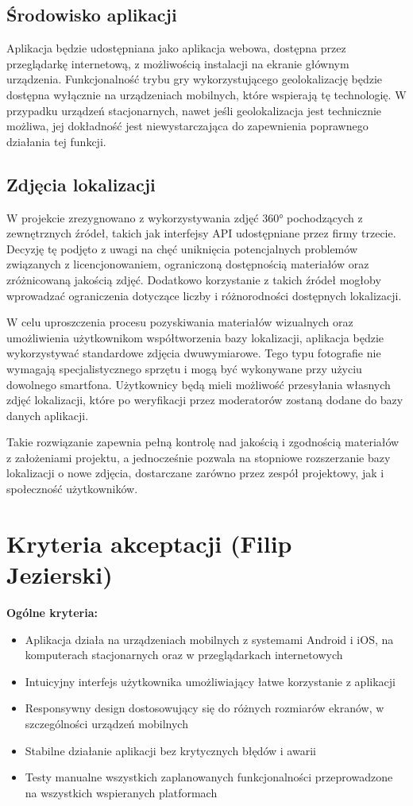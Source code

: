 \subsection{Środowisko aplikacji}
Aplikacja będzie udostępniana jako aplikacja webowa, dostępna przez przeglądarkę internetową, z możliwością instalacji na ekranie głównym urządzenia. Funkcjonalność trybu gry wykorzystującego geolokalizację będzie dostępna wyłącznie na urządzeniach mobilnych, które wspierają tę technologię. W przypadku urządzeń stacjonarnych, nawet jeśli geolokalizacja jest technicznie możliwa, jej dokładność jest niewystarczająca do zapewnienia poprawnego działania tej funkcji.

\subsection{Zdjęcia lokalizacji}
W projekcie zrezygnowano z wykorzystywania zdjęć 360° pochodzących z zewnętrznych źródeł, takich jak interfejsy API udostępniane przez firmy trzecie. Decyzję tę podjęto z uwagi na chęć uniknięcia potencjalnych problemów związanych z licencjonowaniem, ograniczoną dostępnością materiałów oraz zróżnicowaną jakością zdjęć. Dodatkowo korzystanie z takich źródeł mogłoby wprowadzać ograniczenia dotyczące liczby i różnorodności dostępnych lokalizacji.

W celu uproszczenia procesu pozyskiwania materiałów wizualnych oraz umożliwienia użytkownikom współtworzenia bazy lokalizacji, aplikacja będzie wykorzystywać standardowe zdjęcia dwuwymiarowe. Tego typu fotografie nie wymagają specjalistycznego sprzętu i mogą być wykonywane przy użyciu dowolnego smartfona. Użytkownicy będą mieli możliwość przesyłania własnych zdjęć lokalizacji, które po weryfikacji przez moderatorów zostaną dodane do bazy danych aplikacji.

Takie rozwiązanie zapewnia pełną kontrolę nad jakością i zgodnością materiałów z założeniami projektu, a jednocześnie pozwala na stopniowe rozszerzanie bazy lokalizacji o nowe zdjęcia, dostarczane zarówno przez zespół projektowy, jak i społeczność użytkowników.

\section{Kryteria akceptacji (Filip Jezierski)}
\textbf{Ogólne kryteria:}
\begin{itemize}
    \item Aplikacja działa na urządzeniach mobilnych z systemami Android i iOS, na komputerach stacjonarnych oraz w przeglądarkach internetowych
    \item Intuicyjny interfejs użytkownika umożliwiający łatwe korzystanie z aplikacji
    \item Responsywny design dostosowujący się do różnych rozmiarów ekranów, w szczególności urządzeń mobilnych
    \item Stabilne działanie aplikacji bez krytycznych błędów i awarii
    \item Testy manualne wszystkich zaplanowanych funkcjonalności przeprowadzone na wszystkich wspieranych platformach
\end{itemize}

